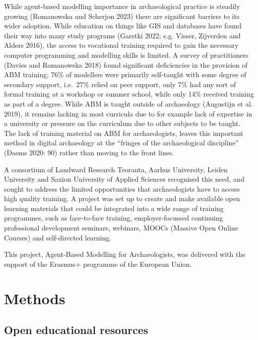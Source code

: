 \documentclass[
]{article}
\begin{document}
While agent-based modelling importance in archaeological practice is steadily growing (Romanowska and Scherjon 2023) there are significant barriers to its wider adoption. While education on things like GIS and databases have found their way into many study programs (Garstki 2022; e.g. Visser, Zijverden and Alders 2016), the access to vocational training required to gain the necessary computer programming and modelling skills is limited. A survey of practitioners (Davies and Romanowska 2018) found significant deficiencies in the provision of ABM training; 76\% of modellers were primarily self-taught with some degree of secondary support, i.e.~27\% relied on peer support, only 7\% had any sort of formal training at a workshop or summer school, while only 14\% received training as part of a degree. While ABM is taught outside of archaeology (Augustijn et al. 2019), it remains lacking in most curricula due to for example lack of expertise in a university or pressure on the curriculum due to other subjects to be taught. The lack of training material on ABM for archaeologists, leaves this important method in digital archaeology at the ``fringes of the archaeological discipline'' (Daems 2020: 90) rather than moving to the front lines.

A consortium of Landward Research Teoranta, Aarhus University, Leiden University and Saxion University of Applied Sciences recognised this need, and sought to address the limited opportunities that archaeologists have to access high quality training. A project was set up to create and make available open learning materials that could be integrated into a wide range of training programmes, such as face-to-face training, employer-focussed continuing professional development seminars, webinars, MOOCs (Massive Open Online Courses) and self-directed learning.

This project, Agent-Based Modelling for Archaeologists, was delivered with the support of the Erasmus+ programme of the European Union.

\hypertarget{methods}{%
\section{Methods}\label{methods}}

\hypertarget{open-educational-resources}{%
\subsection{Open educational resources}\label{open-educational-resources}}
\end{document}

